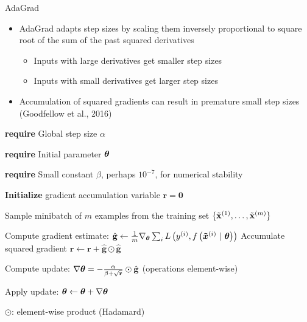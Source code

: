 \documentclass[11pt,compress,t,notes=noshow, xcolor=table]{beamer}
\begin{document}
\begin{vbframe}{AdaGrad}
	\begin{itemize}
        \setlength{\itemsep}{1em}
		\item AdaGrad adapts step sizes by
		scaling them inversely proportional to square root of the sum of the past squared derivatives
		\begin{itemize}
            \setlength{\itemsep}{0.5em}
			\item Inputs with large derivatives get smaller step sizes
			\item Inputs with small derivatives get larger step sizes
		\end{itemize}
		\item Accumulation of squared gradients can result in premature small step sizes (Goodfellow et al., 2016)
	\end{itemize}
	
	
	
\begin{algorithm}[H]
    \caption{AdaGrad}
    \begin{algorithmic}[1]
        \small 
        \State \textbf{require} Global step size $\alpha$ \strut
        \State \textbf{require} Initial parameter $\bm{\theta}$ \strut
        \State \textbf{require} Small constant $\beta$, perhaps $10^{-7}$, for numerical stability \strut
        \State \textbf{Initialize} gradient accumulation variable $\mathbf{r} = \mathbf{0} $
        \State \parbox[t]{\dimexpr\linewidth-\algorithmicindent}{Sample minibatch of $m$ examples from the training set $\{\tilde{\mathbf{x}}^{(1)},\dots,\tilde{\mathbf{x}}^{(m)}\}$ \strut}
        \State Compute gradient estimate: $\hat{\mathbf{g}} \leftarrow \frac{1}{m} \nabla_{\bm{\theta}} \sum_{i} L\left(y^{(i)}, f\left(\bm{\tilde{x}}^{(i)} ~|~ \bm{\theta}\right)\right)$
        \State Accumulate squared gradient $\mathbf{r} \leftarrow \mathbf{r} + \hat{\mathbf{g}} \odot  \hat{\mathbf{g}}$
        \State \parbox[t]{\dimexpr\linewidth-\algorithmicindent}{Compute update: $\nabla \bm{\theta} = - \frac{\alpha}{\beta + \sqrt\mathbf{r}} \odot \hat{\mathbf{g}}$ (operations element-wise) \strut}
        \State Apply update: $\bm{\theta} \leftarrow \bm{\theta} + \nabla\bm{\theta}$
        \EndWhile
    \end{algorithmic}
\end{algorithm}

$\odot$: element-wise product (Hadamard)
\end{vbframe}
\end{document}
